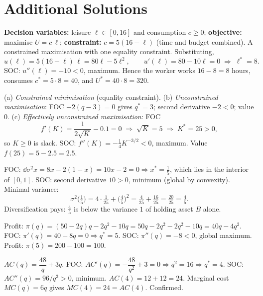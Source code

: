 \section{Additional Solutions}

\begin{solutions}
  \item \textbf{Decision variables:} leisure $\ell\in[0,16]$ and
        consumption $c\ge 0$; \textbf{objective:} maximise
        $U=c\,\ell$; \textbf{constraint:} $c=5(16-\ell)$ (time and
        budget combined). A constrained maximisation with one equality
        constraint. Substituting,
        \[
          u(\ell)=5(16-\ell)\,\ell=80\ell-5\ell^{2}, \qquad
          u'(\ell)=80-10\ell=0 \;\Rightarrow\; \ell^{*}=8 .
        \]
        SOC: $u''(\ell)=-10<0$, maximum. Hence the worker works
        $16-8=8$ hours, consumes $c^{*}=5\cdot 8=40$, and
        $U^{*}=40\cdot 8=320$.

  \item (a) \emph{Constrained minimisation} (equality constraint).
        (b) \emph{Unconstrained maximisation}: FOC $-2(q-3)=0$ gives
        $q^{*}=3$; second derivative $-2<0$; value $0$.
        (c) \emph{Effectively unconstrained maximisation}: FOC
        \[
          f'(K)=\frac{1}{2\sqrt{K}}-0.1=0
          \;\Rightarrow\; \sqrt{K}=5 \;\Rightarrow\; K^{*}=25>0,
        \]
        so $K\ge 0$ is slack. SOC: $f''(K)=-\tfrac14K^{-3/2}<0$,
        maximum. Value $f(25)=5-2.5=2.5$.

  \item FOC:
        $\dd{\sigma^{2}}{x}=8x-2(1-x)=10x-2=0
        \Rightarrow x^{*}=\tfrac15$, which lies in the interior of
        $[0,1]$. SOC: second derivative $10>0$, minimum (global by
        convexity). Minimal variance:
        \[
          \sigma^{2}\bigl(\tfrac15\bigr)
          =4\cdot\tfrac{1}{25}+\bigl(\tfrac45\bigr)^{2}
          =\tfrac{4}{25}+\tfrac{16}{25}=\tfrac{20}{25}=\tfrac45 .
        \]
        Diversification pays: $\tfrac45$ is below the variance $1$ of
        holding asset $B$ alone.

  \item Profit:
        $\pi(q)=(50-2q)q-2q^{2}-10q=50q-2q^{2}-2q^{2}-10q
        =40q-4q^{2}$. FOC: $\pi'(q)=40-8q=0 \Rightarrow q^{*}=5$.
        SOC: $\pi''(q)=-8<0$, global maximum. Profit:
        $\pi(5)=200-100=100$.

  \item $AC(q)=\dfrac{48}{q}+3q$. FOC:
        $AC'(q)=-\dfrac{48}{q^{2}}+3=0 \Rightarrow q^{2}=16
        \Rightarrow q^{*}=4$. SOC: $AC''(q)=96/q^{3}>0$, minimum.
        $AC(4)=12+12=24$. Marginal cost $MC(q)=6q$ gives
        $MC(4)=24=AC(4)$. Confirmed.


\end{solutions}

